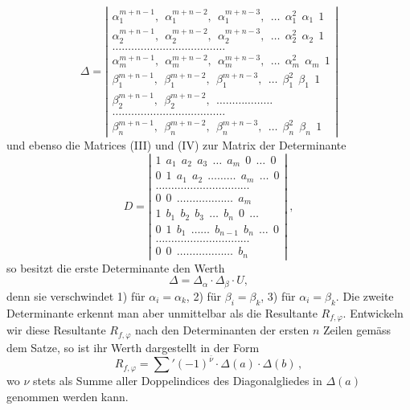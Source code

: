 \[
\Delta =
\left|\begin{array}{l}
\alpha_1^{m+n-1},\ \ \alpha_1^{m+n-2},\ \ \alpha_1^{m+n-3},\ \ \ldots\ \ \alpha_1^{2}\ \ \alpha_1\ \ 1\\
\alpha_2^{m+n-1},\ \ \alpha_2^{m+n-2},\ \ \alpha_2^{m+n-3},\ \ \ldots\ \ \alpha_2^{2}\ \ \alpha_2\ \ 1\\
\ldots\ldots\ldots\ldots\ldots\ldots\ldots\ldots\ldots\ldots\ldots\ldots\\
\alpha_m^{m+n-1},\ \ \alpha_m^{m+n-2},\ \ \alpha_m^{m+n-3},\ \ \ldots\ \ \alpha_m^{2}\ \ \alpha_m\ \ 1\\
\beta_1^{m+n-1},\ \ \beta_1^{m+n-2},\ \ \beta_1^{m+n-3},\ \ \ldots\ \ \beta_1^{2}\ \ \beta_1\ \ 1\\
\beta_2^{m+n-1},\ \ \beta_2^{m+n-2},\ \ \ldots\ldots\ldots\ldots\ldots\ldots\\
\ldots\ldots\ldots\ldots\ldots\ldots\ldots\ldots\ldots\ldots\ldots\ldots\\
\beta_n^{m+n-1},\ \ \beta_n^{m+n-2},\ \ \beta_n^{m+n-3},\ \ \ldots\ \ \beta_n^{2}\ \ \beta_n\ \ 1
\end{array}\right|
\]
und ebenso die Matrices (III) und (IV) zur Matrix der Determinante
\[
D =
\left|\begin{array}{l}
1\ \ a_1\ \ a_2\ \ a_3\ \ \ldots\ \ a_m\ \ 0\ \ \ldots\ \ 0\\
0\ \ 1\ \ a_1\ \ a_2\ \ \ldots\ldots\ldots\ \ a_m\ \ \ldots\ \ 0\\
\ldots\ldots\ldots\ldots\ldots\ldots\ldots\ldots\ldots\ldots\\
0\ \ 0\ \ \ldots\ldots\ldots\ldots\ldots\ldots\ \ a_m\\
1\ \ b_1\ \ b_2\ \ b_3\ \ \ldots\ \ b_n\ \ 0\ \ \ldots\\
0\ \ 1\ \ b_1\ \ \ldots\ldots\ \ b_{n-1}\ \ b_n\ \ \ldots\ \ 0\\
\ldots\ldots\ldots\ldots\ldots\ldots\ldots\ldots\ldots\ldots\\
0\ \ 0\ \ \ldots\ldots\ldots\ldots\ldots\ldots\ \ b_n
\end{array}\right|\ ,
\]
so besitzt die erste Determinante den Werth
\[
\Delta = \Delta_\alpha\cdot\Delta_\beta\cdot U,
\]
denn sie verschwindet 1) für $\alpha_i=\alpha_k$, 2) für $\beta_i=\beta_k$, 3) für $\alpha_i=\beta_k$.
Die zweite Determinante erkennt man aber unmittelbar als die Resultante $R_{f,\varphi}$. Entwickeln wir diese Resultante $R_{f,\varphi}$ nach den
Determinanten der ersten $n$ Zeilen gemäss dem 
Satze, so ist ihr Werth dargestellt in der Form
\[
R_{f,\varphi} = \sum{}'(-1)^{\bar\nu}\cdot\Delta(a)\cdot\Delta(b)\,,
\]
wo $\nu$ stets als Summe aller Doppelindices des Diagonalgliedes in
$\Delta(a)$ genommen werden kann.

